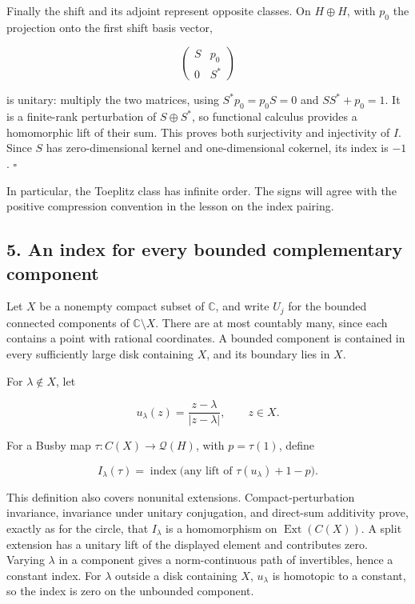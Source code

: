 \documentclass[
  11pt,
]{article}
\newcounter{none} %
\begin{document}
Finally the shift and its adjoint represent opposite classes. On
\(H\oplus H\), with \(p_0\) the projection onto the first shift basis
vector,

\[
\begin{pmatrix}S&p_0\\0&S^*\end{pmatrix}
\]

is unitary: multiply the two matrices, using \(S^*p_0=p_0S=0\) and
\(SS^*+p_0=1\). It is a finite-rank perturbation of \(S\oplus S^*\), so
functional calculus provides a homomorphic lift of their sum. This
proves both surjectivity and injectivity of \(I\). Since \(S\) has
zero-dimensional kernel and one-dimensional cokernel, its index is
\(-1\). \(\square\)

In particular, the Toeplitz class has infinite order. The signs will
agree with the positive compression convention in the lesson on the
index pairing.

\subsection{5. An index for every bounded complementary
component}\label{an-index-for-every-bounded-complementary-component}

Let \(X\) be a nonempty compact subset of \(\mathbb C\), and write
\(U_j\) for the bounded connected components of
\(\mathbb C\setminus X\). There are at most countably many, since each
contains a point with rational coordinates. A bounded component is
contained in every sufficiently large disk containing \(X\), and its
boundary lies in \(X\).

For \(\lambda\notin X\), let

\[
u_\lambda(z)=\frac{z-\lambda}{|z-\lambda|},\qquad z\in X.
\]

For a Busby map \(\tau:C(X)\to\mathcal Q(H)\), with \(p=\tau(1)\),
define

\[
I_\lambda(\tau)=\operatorname{index}\bigl(\text{any lift of }\tau(u_\lambda)+1-p\bigr).
\]

This definition also covers nonunital extensions. Compact-perturbation
invariance, invariance under unitary conjugation, and direct-sum
additivity prove, exactly as for the circle, that \(I_\lambda\) is a
homomorphism on \(\operatorname{Ext}(C(X))\). A split extension has a
unitary lift of the displayed element and contributes zero. Varying
\(\lambda\) in a component gives a norm-continuous path of invertibles,
hence a constant index. For \(\lambda\) outside a disk containing \(X\),
\(u_\lambda\) is homotopic to a constant, so the index is zero on the
unbounded component.
\end{document}
